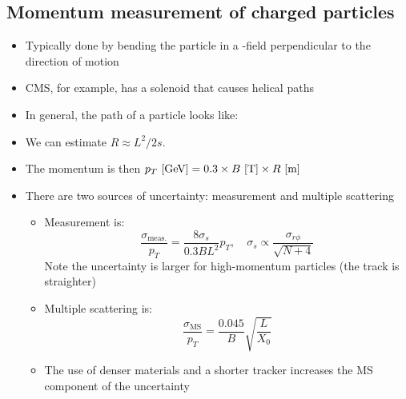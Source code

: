 \subsection{Momentum measurement of charged particles}
\begin{itemize}
  \item Typically done by bending the particle in a \B-field perpendicular to the direction of motion
  \item CMS, for example, has a solenoid that causes helical paths
  \item In general, the path of a particle looks like:
  \item We can estimate $R \approx L^2/2s$. 
  \item The momentum is then $p_T~[\text{GeV}] = 0.3 \times B~[\text{T}] \times R~[\text{m}]$
  \item There are two sources of uncertainty: measurement and multiple scattering
  \begin{itemize}
    \item Measurement is:
    \begin{equation}
      \frac{\sigma_\text{meas.}}{p_T} = \frac{8 \sigma_s}{0.3 BL^2} p_T, \quad \sigma_s \propto \frac{\sigma_{r\phi}}{\sqrt{N+4}}
    \end{equation}
    Note the uncertainty is larger for high-momentum particles (the track is straighter)
    \item Multiple scattering is:
    \begin{equation}
      \frac{\sigma_\text{MS}}{p_T} = \frac{0.045}{B}\sqrt{\frac{L}{X_0}}
    \end{equation}
    \item The use of denser materials and a shorter tracker increases the MS component of the uncertainty
  \end{itemize}
\end{itemize}

